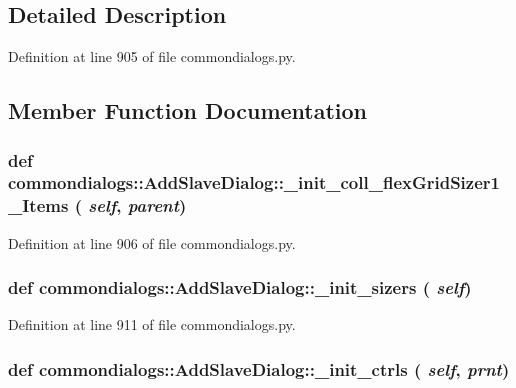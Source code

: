 \subsection{Detailed Description}




Definition at line 905 of file commondialogs.py.

\subsection{Member Function Documentation}
\hypertarget{classcommondialogs_1_1AddSlaveDialog_881e5f01c3bc7205cd81618e99e97bb7}{
\subsubsection[\_\-init\_\-coll\_\-flexGridSizer1\_\-Items]{\setlength{\rightskip}{0pt plus 5cm}def commondialogs::Add\-Slave\-Dialog::\_\-init\_\-coll\_\-flex\-Grid\-Sizer1\_\-Items ( {\em self},  {\em parent})}}
\label{classcommondialogs_1_1AddSlaveDialog_881e5f01c3bc7205cd81618e99e97bb7}




Definition at line 906 of file commondialogs.py.\hypertarget{classcommondialogs_1_1AddSlaveDialog_28596c6fdb967515e753e4ba2f3cbbba}{
\subsubsection[\_\-init\_\-sizers]{\setlength{\rightskip}{0pt plus 5cm}def commondialogs::Add\-Slave\-Dialog::\_\-init\_\-sizers ( {\em self})}}
\label{classcommondialogs_1_1AddSlaveDialog_28596c6fdb967515e753e4ba2f3cbbba}




Definition at line 911 of file commondialogs.py.\hypertarget{classcommondialogs_1_1AddSlaveDialog_1fe2e9fa83c9201e4939cbe28ea70f3d}{
\subsubsection[\_\-init\_\-ctrls]{\setlength{\rightskip}{0pt plus 5cm}def commondialogs::Add\-Slave\-Dialog::\_\-init\_\-ctrls ( {\em self},  {\em prnt})}}
\label{classcommondialogs_1_1AddSlaveDialog_1fe2e9fa83c9201e4939cbe28ea70f3d}




